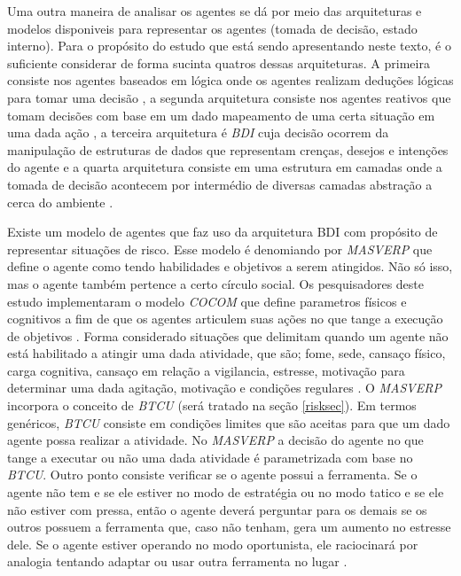Uma outra maneira de analisar os agentes se dá por meio das arquiteturas e modelos disponiveis para representar os agentes (tomada de decisão, estado interno). Para o propósito do estudo que está
sendo apresentando neste texto, é o suficiente considerar de forma sucinta quatros dessas arquiteturas. A primeira consiste nos agentes baseados em lógica onde os agentes realizam deduções lógicas
para tomar uma decisão \cite{logicagent}, a segunda arquitetura consiste nos agentes reativos que tomam decisões com base em um dado mapeamento de uma certa situação em uma dada ação \cite{reactiveagent}, 
a terceira arquitetura é \textit{BDI} cuja decisão ocorrem da manipulação de estruturas de dados que representam crenças, desejos e intenções do agente \cite{bdi} e a quarta arquitetura consiste em uma estrutura 
em camadas onde a tomada de decisão acontecem por intermédio de diversas camadas abstração a cerca do ambiente \cite{layeragent} \cite{whatisagent}.  

Existe um modelo de agentes que faz uso da arquitetura BDI com propósito de representar situações de risco. Esse modelo é denomiando por \textit{MASVERP} que define o agente como tendo habilidades e objetivos a serem atingidos. 
Não só isso, mas o agente também pertence a certo círculo social. Os pesquisadores deste estudo implementaram o modelo \textit{COCOM} que define parametros físicos e cognitivos a fim de que os agentes articulem suas ações no que tange 
a execução de objetivos \cite{mavesp}. Forma considerado situações que delimitam quando um agente não está habilitado a atingir uma dada atividade, que são; fome, sede, cansaço físico, carga cognitiva, cansaço em relação a vigilancia, 
estresse, motivação para determinar uma dada agitação, motivação e condições regulares \cite{mavesp}. O \textit{MASVERP} incorpora o conceito de \textit{BTCU} (será tratado na seção \ref{risksec}). Em termos genéricos, \textit{BTCU} 
consiste em condições limites que são aceitas para que um dado agente possa realizar a atividade. No \textit{MASVERP} a decisão do agente no que tange a executar ou não uma dada atividade é parametrizada com base no \textit{BTCU}.
Outro ponto consiste verificar se o agente possui a ferramenta. Se o agente não tem e se ele estiver no modo de estratégia ou no modo tatico e se ele não estiver com pressa, então o agente deverá perguntar para os demais se os outros 
possuem a ferramenta que, caso não tenham, gera um aumento no estresse dele. Se o agente estiver operando no modo oportunista, ele raciocinará por analogia tentando adaptar ou usar outra ferramenta no lugar \cite{mavesp}. 